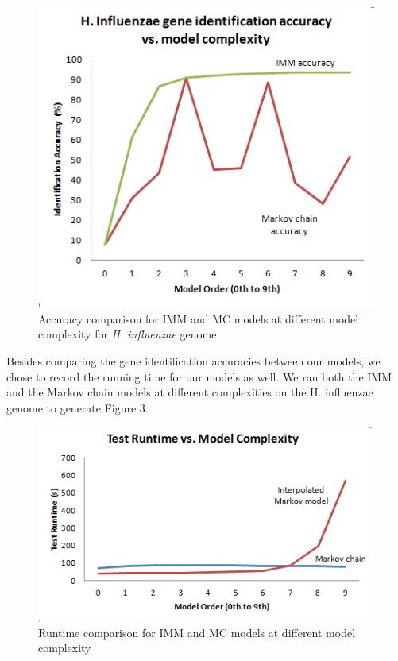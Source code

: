 \documentclass[11pt,letterpaper]{article}
\begin{document}
\begin{figure}
	\begin{center}
		\includegraphics[scale=0.8]{plots/accuracy_vs_model_complexity.png}
	\end{center}
	\caption{\label{font-table} Accuracy comparison for IMM and MC models at different model complexity for \emph{H. influenzae} genome}
\end{figure}

Besides comparing the gene identification accuracies between our models, we chose to record the running time for our models as well. We ran both the IMM and the Markov chain models at different complexities on the H. influenzae genome to generate Figure 3. 

\begin{figure}
	\begin{center}
		\includegraphics[scale=0.8]{plots/runtime_vs_model_complexity.png}
	\end{center}
	\caption{\label{font-table} Runtime comparison for IMM and MC models at different model complexity}
\end{figure}
\end{document}
